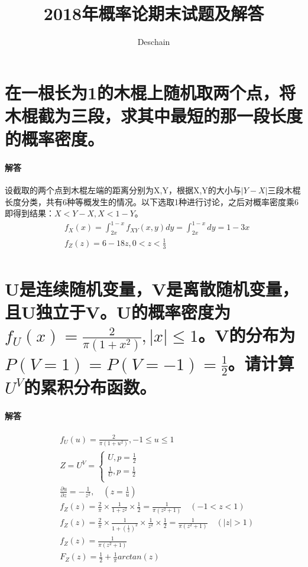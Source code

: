 \documentclass[UTF8]{ctexart}
\title{2018年概率论期末试题及解答}
\author{Deschain}
\begin{document}
\maketitle
\section{在一根长为1的木棍上随机取两个点，将木棍截为三段，求其中最短的那一段长度的概率密度。}
\paragraph{解答}
设截取的两个点到木棍左端的距离分别为X,Y，根据X,Y的大小与$\lvert Y-X\rvert$三段木棍长度分类，共有6种等概发生的情况。以下选取1种进行讨论，之后对概率密度乘6即得到结果：$X<Y-X,X<1-Y$。
\begin{equation*}
\begin{aligned}
&f_X(x)=\int_{2x}^{1-x}f_{XY}(x,y)dy=\int_{2x}^{1-x}dy=1-3x\\
&f_Z(z)=6-18z,0<z<\frac{1}{3}\\
\end{aligned}
\end{equation*}
\section{U是连续随机变量，V是离散随机变量，且U独立于V。U的概率密度为$f_U(x)=\frac{2}{\pi(1+x^2)},\lvert x\rvert\leq1$。V的分布为$P(V=1)=P(V=-1)=\frac{1}{2}$。请计算$U^V$的累积分布函数。}
\paragraph{解答}
\begin{equation*}
\begin{aligned}
&f_U(u)=\frac{2}{\pi(1+u^2)},-1\leq u\leq1\\
&Z=U^V=\begin{cases}
U,p=\frac{1}{2}\\
\frac{1}{U},p=\frac{1}{2}\\
\end{cases}
\\
&\frac{\partial u}{\partial z}=-\frac{1}{z^2},\quad(z=\frac{1}{u}) \\
&f_Z(z)=\frac{2}{\pi}\times\frac{1}{1+z^2}\times\frac{1}{2}=\frac{1}{\pi(z^2+1)}\quad(-1<z<1)\\
&f_Z(z)=\frac{2}{\pi}\times\frac{1}{1+(\frac{1}{z})^2}\times\frac{1}{z^2}\times\frac{1}{2}=\frac{1}{\pi(z^2+1)}\quad(\lvert z\rvert >1)\\
&f_Z(z)=\frac{1}{\pi(z^2+1)}\\
&F_Z(z)=\frac{1}{2}+\frac{1}{\pi}arctan(z)\\
\end{aligned}
\end{equation*}
\end{document}
